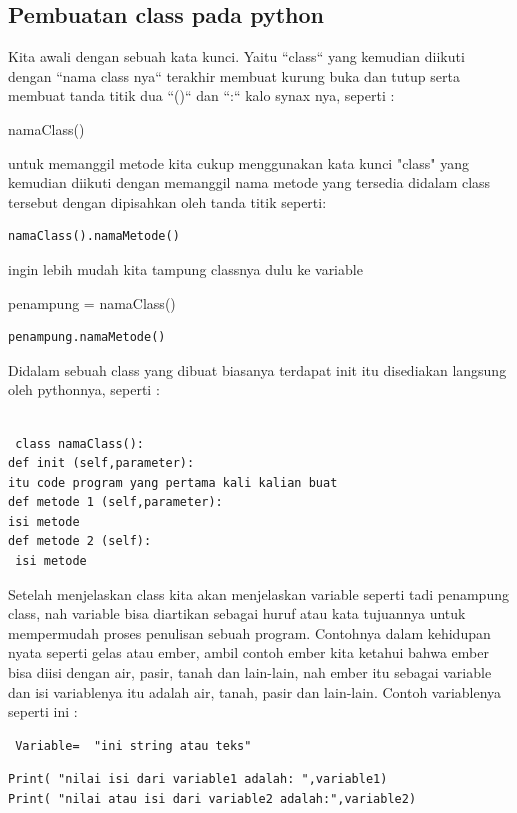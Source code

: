 \begin{enumerate}
\subsection{Pembuatan class pada python}
Kita awali dengan sebuah kata kunci. Yaitu ``class`` yang kemudian diikuti dengan ``nama class nya`` terakhir membuat kurung buka dan tutup serta membuat tanda titik dua  ``()`` dan ``:`` kalo synax nya, seperti :

namaClass()

untuk memanggil metode kita cukup menggunakan kata kunci "class" yang kemudian diikuti dengan memanggil nama metode yang tersedia didalam class tersebut dengan dipisahkan oleh tanda titik seperti:
\begin{verbatim}
namaClass().namaMetode()
\end{verbatim}
ingin lebih mudah kita tampung classnya dulu ke variable

penampung = namaClass()
\begin{verbatim}
penampung.namaMetode()
\end{verbatim}
Didalam sebuah class yang dibuat biasanya terdapat init itu disediakan langsung oleh pythonnya, seperti :


\begin{verbatim}

 class namaClass():
def init (self,parameter):
itu code program yang pertama kali kalian buat
def metode 1 (self,parameter):
isi metode
def metode 2 (self):
 isi metode

 \end{verbatim}

Setelah menjelaskan class kita akan menjelaskan variable seperti tadi penampung class, nah variable bisa diartikan sebagai huruf atau kata tujuannya untuk mempermudah proses penulisan sebuah program. Contohnya dalam kehidupan nyata seperti gelas atau ember, ambil contoh ember kita ketahui bahwa ember bisa diisi dengan air, pasir, tanah dan lain-lain, nah ember itu sebagai variable dan isi variablenya itu adalah air, tanah, pasir dan lain-lain.
Contoh variablenya seperti ini :

\begin{verbatim}
 Variable=  "ini string atau teks"
\end{verbatim}

\begin{verbatim}
Print( "nilai isi dari variable1 adalah: ",variable1)
Print( "nilai atau isi dari variable2 adalah:",variable2)
\end{verbatim}


\end{enumerate}

